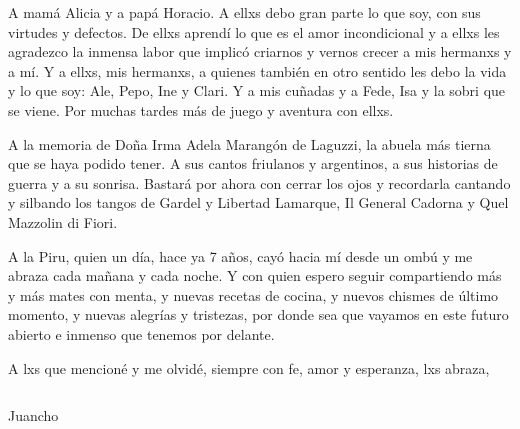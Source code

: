 A mamá Alicia y a papá Horacio. A ellxs debo gran parte lo que soy, con sus virtudes y defectos. De ellxs aprendí lo que es el amor incondicional y a ellxs les agradezco la inmensa labor que implicó criarnos y vernos crecer a mis hermanxs y a mí. Y a ellxs, mis hermanxs, a quienes también en otro sentido les debo la vida y lo que soy: Ale, Pepo, Ine y Clari. Y a mis cuñadas y a Fede, Isa y la sobri que se viene. Por muchas tardes más de juego y aventura con ellxs.

A la memoria de Doña Irma Adela Marangón de Laguzzi, la abuela más tierna que se haya podido tener. A sus cantos friulanos y argentinos, a sus historias de guerra y a su sonrisa. Bastará por ahora con cerrar los ojos y recordarla cantando y silbando los tangos de Gardel y Libertad Lamarque, Il General Cadorna y Quel Mazzolin di Fiori.

A la Piru, quien un día, hace ya 7 años, cayó hacia mí desde un ombú y me abraza cada mañana y cada noche. Y con quien espero seguir compartiendo más y más mates con menta, y nuevas recetas de cocina, y nuevos chismes de último momento, y nuevas alegrías y tristezas, por donde sea que vayamos en este futuro abierto e inmenso que tenemos por delante.

A lxs que mencioné y me olvidé, siempre con fe, amor y esperanza, lxs abraza,

$\quad$

Juancho